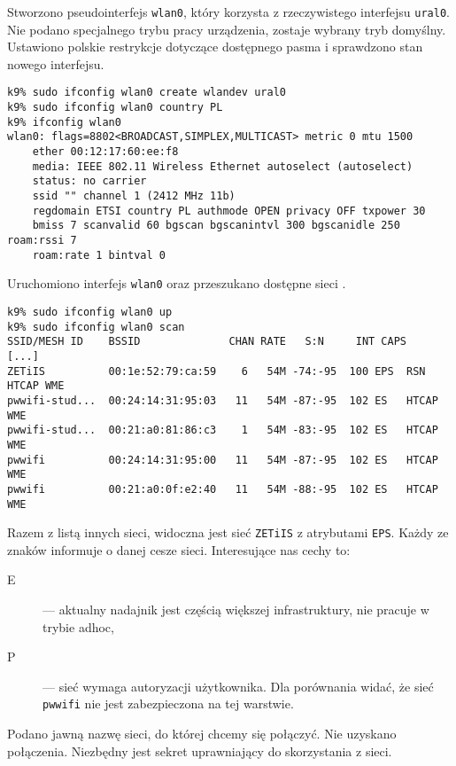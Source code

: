 Stworzono pseudo\dywiz interfejs \texttt{wlan0}, który korzysta z rzeczywistego
interfejsu \texttt{ural0}. Nie podano specjalnego trybu pracy urządzenia,
zostaje wybrany tryb domyślny. Ustawiono polskie restrykcje dotyczące dostępnego
pasma i sprawdzono stan nowego interfejsu.

\begin{lstlisting}
k9% sudo ifconfig wlan0 create wlandev ural0
k9% sudo ifconfig wlan0 country PL
k9% ifconfig wlan0
wlan0: flags=8802<BROADCAST,SIMPLEX,MULTICAST> metric 0 mtu 1500
    ether 00:12:17:60:ee:f8
    media: IEEE 802.11 Wireless Ethernet autoselect (autoselect)
    status: no carrier
    ssid "" channel 1 (2412 MHz 11b)
    regdomain ETSI country PL authmode OPEN privacy OFF txpower 30
    bmiss 7 scanvalid 60 bgscan bgscanintvl 300 bgscanidle 250 roam:rssi 7
    roam:rate 1 bintval 0
\end{lstlisting}

Uruchomiono interfejs \texttt{wlan0} oraz przeszukano dostępne sieci \wifi.

\begin{lstlisting}
k9% sudo ifconfig wlan0 up
k9% sudo ifconfig wlan0 scan
SSID/MESH ID    BSSID              CHAN RATE   S:N     INT CAPS
[...]
ZETiIS          00:1e:52:79:ca:59    6   54M -74:-95  100 EPS  RSN HTCAP WME
pwwifi-stud...  00:24:14:31:95:03   11   54M -87:-95  102 ES   HTCAP WME
pwwifi-stud...  00:21:a0:81:86:c3    1   54M -83:-95  102 ES   HTCAP WME
pwwifi          00:24:14:31:95:00   11   54M -87:-95  102 ES   HTCAP WME
pwwifi          00:21:a0:0f:e2:40   11   54M -88:-95  102 ES   HTCAP WME
\end{lstlisting}

Razem z listą innych sieci, widoczna jest sieć \texttt{ZETiIS} z atrybutami
\texttt{EPS}. Każdy ze znaków informuje o danej cesze sieci. Interesujące nas
cechy to:

\begin{description}
    \item[E] --- aktualny nadajnik jest częścią większej infrastruktury, nie
        pracuje w trybie ad\dywiz hoc,
    \item[P] --- sieć wymaga autoryzacji użytkownika. Dla porównania widać, że
        sieć \texttt{pwwifi} nie jest zabezpieczona na tej warstwie.
\end{description}

Podano jawną nazwę sieci, do której chcemy się połączyć. Nie uzyskano
połączenia. Niezbędny jest sekret uprawniający do skorzystania z sieci.

